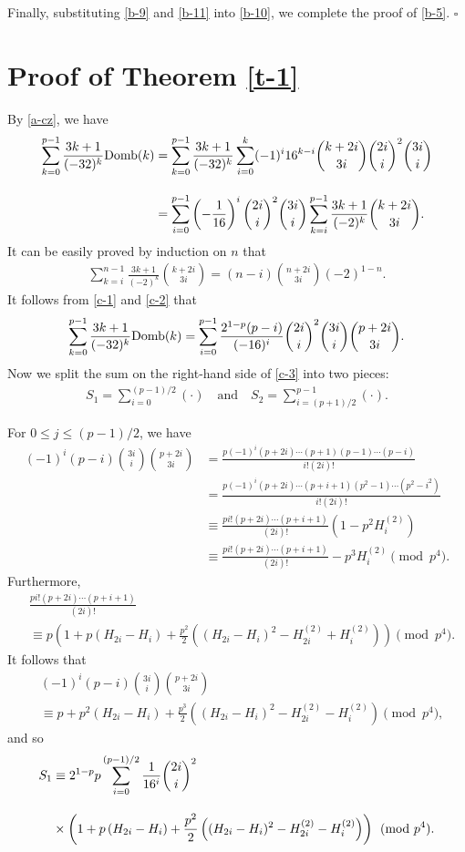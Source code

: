 \documentclass[12pt]{article}
\numberwithin{equation}{section}
\newcommand{\qed}{{\hfill$\square$}\medskip}
\begin{document}
Finally, substituting \eqref{b-9} and \eqref{b-11} into \eqref{b-10}, we complete the proof of
\eqref{b-5}.
\qed

\section{Proof of Theorem \ref{t-1}}
By \eqref{a-cz}, we have
\begin{align}
\sum_{k=0}^{p-1}\frac{3k+1}{(-32)^k}{\rm Domb}(k)
&=\sum_{k=0}^{p-1}\frac{3k+1}{(-32)^k}\sum_{i=0}^k(-1)^i16^{k-i}{k+2i\choose 3i}{2i\choose i}^2{3i\choose i}\notag\\[10pt]
&=\sum_{i=0}^{p-1}\left(-\frac{1}{16}\right)^i{2i\choose i}^2{3i\choose i}\sum_{k=i}^{p-1}\frac{3k+1}{(-2)^k}{k+2i\choose 3i}.\label{c-1}
\end{align}
It can be easily proved by induction on $n$ that
\begin{align}
\sum_{k=i}^{n-1}\frac{3k+1}{(-2)^k}{k+2i\choose 3i}=(n-i){n+2i\choose 3i}(-2)^{1-n}.\label{c-2}
\end{align}
It follows from \eqref{c-1} and \eqref{c-2} that
\begin{align}
\sum_{k=0}^{p-1}\frac{3k+1}{(-32)^k}{\rm Domb}(k)
=\sum_{i=0}^{p-1}\frac{2^{1-p}(p-i)}{(-16)^i}{2i\choose i}^2{3i\choose i}
{p+2i\choose 3i}.\label{c-3}
\end{align}
Now we split the sum on the right-hand side of \eqref{c-3} into two pieces:
\begin{align*}
S_1=\sum_{i=0}^{(p-1)/2}(\cdot)\quad\text{and}\quad S_2=\sum_{i=(p+1)/2}^{p-1}(\cdot).
\end{align*}

For $0\le j\le (p-1)/2$, we have
\begin{align*}
(-1)^i(p-i){3i\choose i}{p+2i\choose 3i}
&=\frac{p(-1)^i(p+2i)\cdots(p+1)(p-1)\cdots(p-i)}{i!(2i)!}\\[10pt]
&=\frac{p(-1)^i(p+2i)\cdots(p+i+1)(p^2-1)\cdots(p^2-i^2)}{i!(2i)!}\\[10pt]
&\equiv \frac{pi!(p+2i)\cdots(p+i+1)}{(2i)!}\left(1-p^2H_i^{(2)}\right)\\[10pt]
&\equiv \frac{pi!(p+2i)\cdots(p+i+1)}{(2i)!}-p^3H_i^{(2)}\pmod{p^4}.
\end{align*}
Furthermore,
\begin{align*}
&\frac{pi!(p+2i)\cdots(p+i+1)}{(2i)!}\\[10pt]
&\equiv p\left(1+p\left(H_{2i}-H_i\right)+\frac{p^2}{2}\left((H_{2i}-H_i)^2-H_{2i}^{(2)}+H_i^{(2)}\right)\right)
\pmod{p^4}.
\end{align*}
It follows that
\begin{align*}
&(-1)^i(p-i){3i\choose i}{p+2i\choose 3i}\\[10pt]
&\equiv p+p^2\left(H_{2i}-H_i\right)+\frac{p^3}{2}\left((H_{2i}-H_i)^2-H_{2i}^{(2)}-H_i^{(2)}\right)
\pmod{p^4},
\end{align*}
and so
\begin{align}
S_1&\equiv 2^{1-p}p\sum_{i=0}^{(p-1)/2}\frac{1}{16^i}{2i\choose i}^2\notag\\[10pt]
&\times\left(1+p\left(H_{2i}-H_i\right)+\frac{p^2}{2}\left((H_{2i}-H_i)^2-H_{2i}^{(2)}-H_i^{(2)}\right)\right)
\pmod{p^4}.\label{c-4}
\end{align}
\end{document}
